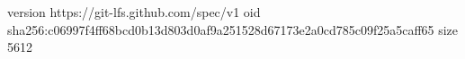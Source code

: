 version https://git-lfs.github.com/spec/v1
oid sha256:c06997f4ff68bcd0b13d803d0af9a251528d67173e2a0cd785c09f25a5caff65
size 5612
